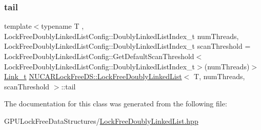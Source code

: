 \mbox{\label{class_n_u_c_a_r_lock_free_d_s_1_1_lock_free_doubly_linked_list_a026dc6f5ad4ec7007de1cf858f9c1c2d}} 
\subsubsection{\texorpdfstring{tail}{tail}}
{\footnotesize\ttfamily template$<$typename T , Lock\+Free\+Doubly\+Linked\+List\+Config\+::\+Doubly\+Linked\+List\+Index\+\_\+t num\+Threads, Lock\+Free\+Doubly\+Linked\+List\+Config\+::\+Doubly\+Linked\+List\+Index\+\_\+t scan\+Threshold = Lock\+Free\+Doubly\+Linked\+List\+Config\+::\+Get\+Default\+Scan\+Threshold$<$\+Lock\+Free\+Doubly\+Linked\+List\+Config\+::\+Doubly\+Linked\+List\+Index\+\_\+t$>$(num\+Threads)$>$ \\
\mbox{\hyperlink{class_n_u_c_a_r_lock_free_d_s_1_1_lock_free_doubly_linked_list_a08f21d5e04bc2a02d6c1d8861a6ba0de}{Link\+\_\+t}} \mbox{\hyperlink{class_n_u_c_a_r_lock_free_d_s_1_1_lock_free_doubly_linked_list}{N\+U\+C\+A\+R\+Lock\+Free\+D\+S\+::\+Lock\+Free\+Doubly\+Linked\+List}}$<$ T, num\+Threads, scan\+Threshold $>$\+::tail\hspace{0.3cm}{\ttfamily [private]}}



The documentation for this class was generated from the following file\+:\begin{DoxyCompactItemize}
\item 
G\+P\+U\+Lock\+Free\+Data\+Structures/\mbox{\hyperlink{_lock_free_doubly_linked_list_8hpp}{Lock\+Free\+Doubly\+Linked\+List.\+hpp}}\end{DoxyCompactItemize}
